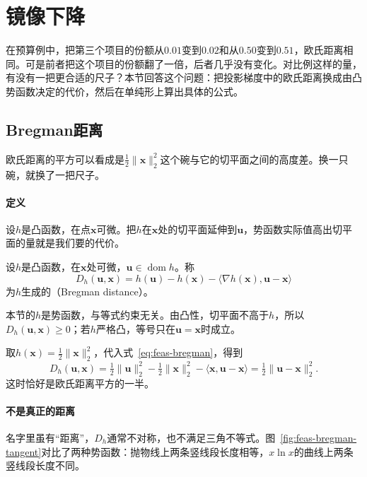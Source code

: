 \section{镜像下降}
\label{sec:feas-mirror}

在预算例中，把第三个项目的份额从$0.01$变到$0.02$和从$0.50$变到$0.51$，欧氏距离相同。可是前者把这个项目的份额翻了一倍，后者几乎没有变化。对比例这样的量，有没有一把更合适的尺子？本节回答这个问题：把投影梯度中的欧氏距离换成由凸势函数决定的代价，然后在单纯形上算出具体的公式。

\subsection{Bregman距离}
\label{sec:feas-bregman}

欧氏距离的平方可以看成是$\tfrac12\lVert\bm{x}\rVert_2^2$这个碗与它的切平面之间的高度差。换一只碗，就换了一把尺子。

\paragraph{定义}
设$h$是凸函数，在点$\bm{x}$可微。把$h$在$\bm{x}$处的切平面延伸到$\bm{u}$，势函数实际值高出切平面的量就是我们要的代价。

\begin{definition}[Bregman距离]
\label{def:feas-bregman}
设$h$是凸函数，在$\bm{x}$处可微，$\bm{u}\in\operatorname{dom}h$。称
\begin{equation}
 D_h(\bm{u},\bm{x})=h(\bm{u})-h(\bm{x})-\langle\nabla h(\bm{x}),\bm{u}-\bm{x}\rangle
 \label{eq:feas-bregman}
\end{equation}
为$h$生成的（Bregman distance）。
\end{definition}

本节的$h$是势函数，与等式约束无关。由凸性，切平面不高于$h$，所以$D_h(\bm{u},\bm{x})\geq0$；若$h$严格凸，等号只在$\bm{u}=\bm{x}$时成立。

取$h(\bm{x})=\tfrac12\lVert\bm{x}\rVert_2^2$，代入式~\eqref{eq:feas-bregman}，得到
\[
 D_h(\bm{u},\bm{x})=\tfrac12\lVert\bm{u}\rVert_2^2-\tfrac12\lVert\bm{x}\rVert_2^2-\langle\bm{x},\bm{u}-\bm{x}\rangle=\tfrac12\lVert\bm{u}-\bm{x}\rVert_2^2.
\]
这时恰好是欧氏距离平方的一半。

\paragraph{不是真正的距离}
名字里虽有“距离”，$D_h$通常不对称，也不满足三角不等式。图~\ref{fig:feas-bregman-tangent}对比了两种势函数：抛物线上两条竖线段长度相等，$x\ln x$的曲线上两条竖线段长度不同。

